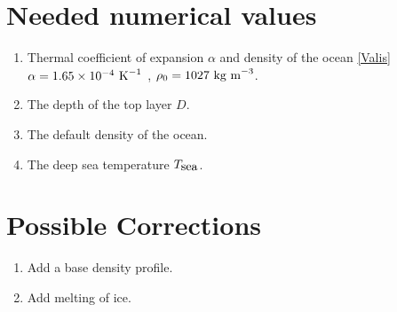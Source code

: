 \documentclass[fontsize = 13pt]{scrartcl}
\begin{document}
\section{Needed numerical values}
\begin{enumerate}
    \item Thermal coefficient of expansion \(\alpha\) and density of the ocean
      \ref{Valis}\\
        \(\alpha = 1.65 \times 10^{-4}\mbox{ K}^{-1}\) , \(\rho_0 =  1027 \mbox{ kg m}^{-3}\).
    \item The depth of the top layer \(D\).
    \item The default density of the ocean.
    \item The deep sea temperature \(T_{\mbox{sea}}\).
\end{enumerate}
\section{Possible Corrections}
\begin{enumerate}
    \item Add a base density profile.
    \item Add melting of ice.
\end{enumerate}
\end{document}
